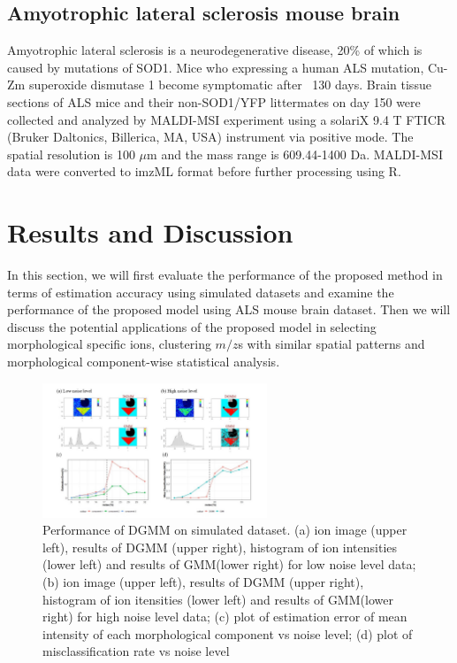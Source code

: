\documentclass{bioinfo}
\begin{document}
\subsection{Amyotrophic lateral sclerosis mouse brain}
Amyotrophic lateral sclerosis is a neurodegenerative disease, 20\% of which is caused by mutations of SOD1. Mice who expressing a human ALS mutation, Cu-Zm superoxide dismutase 1 become symptomatic after ~130 days. Brain tissue sections of ALS mice and their non-SOD1/YFP littermates on day 150 were collected and analyzed by MALDI-MSI experiment using a solariX 9.4 T FTICR
(Bruker Daltonics, Billerica, MA, USA) instrument via positive mode. The spatial resolution is 100 $\mu$m and the mass range is 609.44-1400 Da. MALDI-MSI data were converted to imzML format before further processing using R.













\section{Results and Discussion}
In this section, we will first evaluate the performance of the proposed method in terms of estimation accuracy using simulated datasets and examine the performance of the proposed model using ALS mouse brain dataset. Then we will discuss the potential applications of the proposed model in selecting morphological specific ions, clustering $m/z$s with similar spatial patterns and morphological component-wise statistical analysis.











\begin{figure}[b!]
    \centering
	\includegraphics[width=0.6\textwidth]{figure4.jpg}
    \caption{Performance of DGMM on simulated dataset. (a) ion image (upper left), results of DGMM (upper right), histogram of ion intensities (lower left) and results of GMM(lower right) for low noise level data; (b) ion image (upper left), results of DGMM (upper right), histogram of ion itensities (lower left) and results of GMM(lower right) for high noise level data; (c) plot of estimation error of mean intensity of each morphological component vs noise level; (d) plot of misclassification rate vs noise level}
    \label{fig:figure3}
\end{figure}
\end{document}

